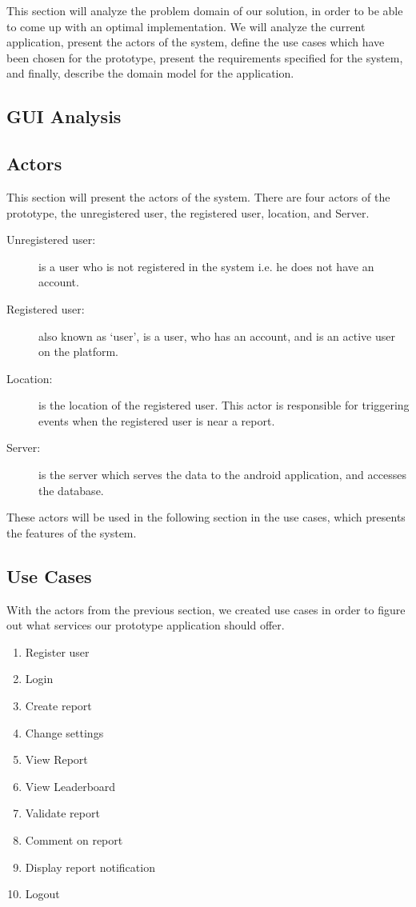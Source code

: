 
This section will analyze the problem domain of our solution, in order to be able to come up with an optimal implementation. We will analyze the current application, present the actors of the system, define the use cases which have been chosen for the prototype, present the requirements specified for the system, and finally, describe the domain model for the application.


\subsection{GUI Analysis}
\subsection{Actors}
This section will present the actors of the system. There are four actors of the prototype, the unregistered user, the registered user, location, and Server.

\begin{description}
\item [Unregistered user:] is a user who is not registered in the system i.e. he does not have an account.
\item [Registered user:] also known as ‘user’, is a user, who has an account, and is an active user on the platform.
\item [Location:] is the location of the registered user. This actor is responsible for triggering events when the registered user is near a report.
\item [Server:] is the server which serves the data to the android application, and accesses the database.
\end{description}
These actors will be used in the following section in the use cases, which presents the features of the system.


\subsection{Use Cases}
With the actors from the previous section, we created use cases in order to figure out what services our prototype application should offer.

\begin{enumerate}[label=UC\arabic*]
\item Register user
\item Login
\item Create report
\item Change settings
\item View Report
\item View Leaderboard
\item Validate report
\item Comment on report
\item Display report notification
\item Logout
\end{enumerate}

